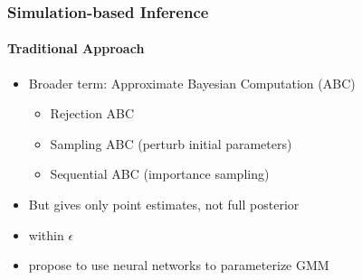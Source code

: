 \documentclass[9pt]{beamer}
\begin{document}
%



\begin{frame}
\frametitle{Simulation-based Inference}
\framesubtitle{Traditional Approach}
\begin{itemize}
	\item Broader term: Approximate Bayesian Computation (ABC)
	\begin{itemize}
		\item Rejection ABC
		\item Sampling ABC (perturb initial parameters)
		\item Sequential ABC (importance sampling)
	\end{itemize}
		\item But gives only point estimates, not full posterior
		\item within $\epsilon$
	\item \cite{papamakarios2016fast} propose to use neural networks to parameterize GMM
\end{itemize}
\end{frame} 
\end{document}
